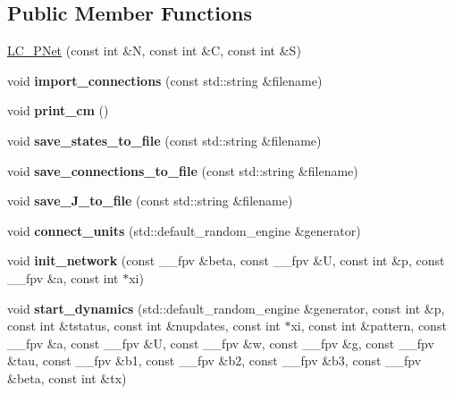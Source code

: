 \subsection*{Public Member Functions}
\begin{DoxyCompactItemize}
\item 
\hyperlink{class_l_c___p_net_a24f5b64eb7d135f812b05cfe747ddcc3}{L\+C\+\_\+\+P\+Net} (const int \&N, const int \&C, const int \&S)
\item 
\hypertarget{class_l_c___p_net_a699f289ae423aa2af17139502654ab81}{}void {\bfseries import\+\_\+connections} (const std\+::string \&filename)\label{class_l_c___p_net_a699f289ae423aa2af17139502654ab81}

\item 
\hypertarget{class_l_c___p_net_afedba98cfd4a57742b963bf1fefdebed}{}void {\bfseries print\+\_\+cm} ()\label{class_l_c___p_net_afedba98cfd4a57742b963bf1fefdebed}

\item 
\hypertarget{class_l_c___p_net_ac66589462b8882839a7a9849ce2025fa}{}void {\bfseries save\+\_\+states\+\_\+to\+\_\+file} (const std\+::string \&filename)\label{class_l_c___p_net_ac66589462b8882839a7a9849ce2025fa}

\item 
\hypertarget{class_l_c___p_net_a1a66a51c4b649d64812d8c7eb49bda56}{}void {\bfseries save\+\_\+connections\+\_\+to\+\_\+file} (const std\+::string \&filename)\label{class_l_c___p_net_a1a66a51c4b649d64812d8c7eb49bda56}

\item 
\hypertarget{class_l_c___p_net_afef840ecfc8b5b3a9180ca3c8e7f821f}{}void {\bfseries save\+\_\+\+J\+\_\+to\+\_\+file} (const std\+::string \&filename)\label{class_l_c___p_net_afef840ecfc8b5b3a9180ca3c8e7f821f}

\item 
\hypertarget{class_l_c___p_net_ab9a618c5fc495ee199b420d0aa16758a}{}void {\bfseries connect\+\_\+units} (std\+::default\+\_\+random\+\_\+engine \&generator)\label{class_l_c___p_net_ab9a618c5fc495ee199b420d0aa16758a}

\item 
\hypertarget{class_l_c___p_net_a0308d587505adab982a9e4322b8ac9ba}{}void {\bfseries init\+\_\+network} (const \+\_\+\+\_\+fpv \&beta, const \+\_\+\+\_\+fpv \&U, const int \&p, const \+\_\+\+\_\+fpv \&a, const int $\ast$xi)\label{class_l_c___p_net_a0308d587505adab982a9e4322b8ac9ba}

\item 
\hypertarget{class_l_c___p_net_adadf57b63af5fc9238bb97df3b56381d}{}void {\bfseries start\+\_\+dynamics} (std\+::default\+\_\+random\+\_\+engine \&generator, const int \&p, const int \&tstatus, const int \&nupdates, const int $\ast$xi, const int \&pattern, const \+\_\+\+\_\+fpv \&a, const \+\_\+\+\_\+fpv \&U, const \+\_\+\+\_\+fpv \&w, const \+\_\+\+\_\+fpv \&g, const \+\_\+\+\_\+fpv \&tau, const \+\_\+\+\_\+fpv \&b1, const \+\_\+\+\_\+fpv \&b2, const \+\_\+\+\_\+fpv \&b3, const \+\_\+\+\_\+fpv \&beta, const int \&tx)\label{class_l_c___p_net_adadf57b63af5fc9238bb97df3b56381d}

\end{DoxyCompactItemize}
